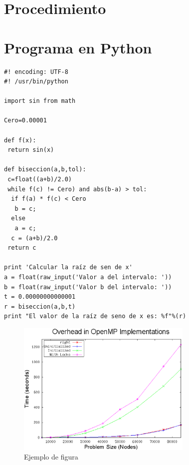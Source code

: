 


\section{Procedimiento}
\label{3:sec:1}


\section{Programa en Python}
\label{3:sec:2}
\begin{verbatim}
#! encoding: UTF-8
#! /usr/bin/python 

import sin from math

Cero=0.00001

def f(x):
 return sin(x)

def biseccion(a,b,tol):
 c=float((a+b)/2.0)
 while f(c) != Cero) and abs(b-a) > tol:
  if f(a) * f(c) < Cero
   b = c;
  else
   a = c;
  c = (a+b)/2.0
 return c

print 'Calcular la raíz de sen de x'
a = float(raw_input('Valor a del intervalo: '))
b = float(raw_input('Valor b del intervalo: '))
t = 0.00000000000001
r = biseccion(a,b,t)
print "El valor de la raíz de seno de x es: %f"%(r)
\end{verbatim}

\begin{figure}[!th]
\begin{center}
\includegraphics[width=0.75\textwidth]{images/figura1.eps}
\caption{Ejemplo de figura}
\label{fig:1}
\end{center}
\end{figure}





